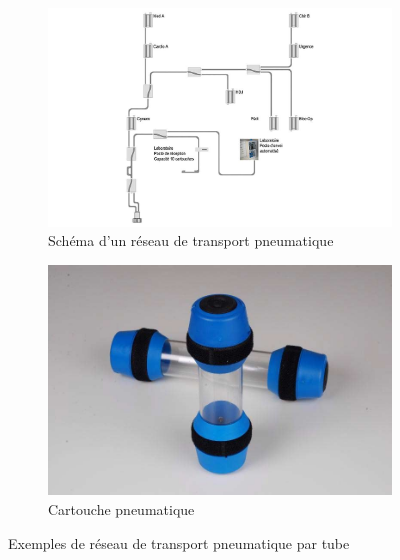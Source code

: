 \begin{figure}[h!]
    \centering
    \begin{subfigure}{0.45\textwidth}
        \centering
        \includegraphics[width=\linewidth]{assets/figures/Hardware/transport_pneu/reseau_pneumatique_hopital.jpg} %
        \caption{Schéma d'un réseau de transport pneumatique}
    \end{subfigure}\hfill
    \begin{subfigure}{0.45\textwidth}
        \centering
        \includegraphics[width=\linewidth]{assets/figures/Hardware/transport_pneu/cartouche_transport_pneu.jpg} %
        \caption{Cartouche pneumatique}
    \end{subfigure}
    \caption{Exemples de réseau de transport pneumatique par tube}
\end{figure}


